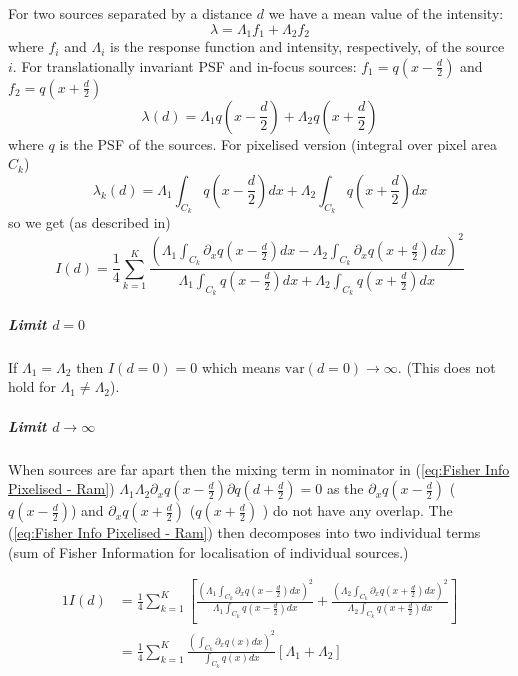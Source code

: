 For two sources separated by a distance $d$ we have a mean value of the intensity:
%
\begin{equation}
	\lambda=\Lambda_{1}f_{1}+\Lambda_{2}f_{2}
\end{equation}
%
where $f_{i}$ and $\Lambda_{i}$ is the response function and intensity, respectively, of the source $i$. For translationally invariant PSF
and in-focus sources: $f_{1}=q(x-\frac{d}{2})$ and $f_{2}=q(x+\frac{d}{2})$
%
\begin{equation}
	\lambda(d)=\Lambda_{1}q(x-\frac{d}{2})+\Lambda_{2}q(x+\frac{d}{2})
\end{equation}
%
where $q$ is the PSF of the sources. For pixelised version (integral over pixel area $C_{k}$)
%
\begin{equation}
	\lambda_{k}(d)=\Lambda_{1}\int_{C_{k}}q(x-\frac{d}{2})dx+\Lambda_{2}\int_{C_{k}}q(x+\frac{d}{2})dx
\end{equation}
%
so we get (as described in\citet{Ram2006})
%
\begin{equation}
	I(d)=\frac{1}{4}\sum_{k=1}^{K}\frac{\left(\Lambda_{1}\int_{C_{k}}\partial_{x}q(x-\frac{d}{2})dx-\Lambda_{2}\int_{C_{k}}\partial_{x}q(x+\frac{d}{2})dx\right)^{2}}{\Lambda_{1}\int_{C_{k}}q(x-\frac{d}{2})dx+\Lambda_{2}\int_{C_{k}}q(x+\frac{d}{2})dx}\label{eq:Fisher Info Pixelised - Ram}
\end{equation}

\subparagraph*{Limit $d=0$}

If $\Lambda_{1}=\Lambda_{2}$ then $I(d=0)=0$ which means $\textrm{var}(d=0)\rightarrow\infty$. (This does not hold for $\Lambda_{1}\neq\Lambda_{2}$). 

\subparagraph*{Limit $d\rightarrow\infty$}

When sources are far apart then the mixing term in nominator in (\ref{eq:Fisher Info Pixelised - Ram}) $\Lambda_{1}\Lambda_{2}\partial_{x}q(x-\frac{d}{2})\partial q(d+\frac{d}{2})=0$ as the $\partial_{x}q(x-\frac{d}{2})$ ($q(x-\frac{d}{2})$) and $\partial_{x}q(x+\frac{d}{2})$ ($q(x+\frac{d}{2})$ ) do not have any overlap. The (\ref{eq:Fisher Info Pixelised - Ram}) then decomposes into two individual terms (sum of Fisher Information for localisation of individual sources.)

\begin{alignat*}{1}
	I(d) & =\frac{1}{4}\sum_{k=1}^{K}\left[\frac{\left(\Lambda_{1}\int_{C_{k}}\partial_{x}q(x-\frac{d}{2})dx\right)^{2}}{\Lambda_{1}\int_{C_{k}}q(x-\frac{d}{2})dx}+\frac{\left(\Lambda_{2}\int_{C_{k}}\partial_{x}q(x+\frac{d}{2})dx\right)^{2}}{\Lambda_{2}\int_{C_{k}}q(x+\frac{d}{2})dx}\right]\\
	 & =\frac{1}{4}\sum_{k=1}^{K}\frac{\left(\int_{C_{k}}\partial_{x}q(x)dx\right)^{2}}{\int_{C_{k}}q(x)dx}\left[\Lambda_{1}+\Lambda_{2}\right]
\end{alignat*}

